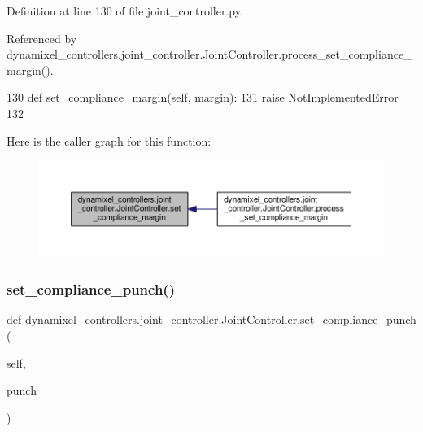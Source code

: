 Definition at line 130 of file joint\+\_\+controller.\+py.



Referenced by dynamixel\+\_\+controllers.\+joint\+\_\+controller.\+Joint\+Controller.\+process\+\_\+set\+\_\+compliance\+\_\+margin().


\begin{DoxyCode}
130     \textcolor{keyword}{def }set\_compliance\_margin(self, margin):
131         \textcolor{keywordflow}{raise} NotImplementedError
132 
\end{DoxyCode}
Here is the caller graph for this function\+:
\nopagebreak
\begin{figure}[H]
\begin{center}
\leavevmode
\includegraphics[width=350pt]{d3/dcd/classdynamixel__controllers_1_1joint__controller_1_1_joint_controller_ac05dc0cc7cfeade108bec65b5937c172_icgraph}
\end{center}
\end{figure}
\mbox{\label{classdynamixel__controllers_1_1joint__controller_1_1_joint_controller_a3d62f11f16ce860e39dfbfaa2b598a5b}} 
\subsubsection{\texorpdfstring{set\+\_\+compliance\+\_\+punch()}{set\_compliance\_punch()}}
{\footnotesize\ttfamily def dynamixel\+\_\+controllers.\+joint\+\_\+controller.\+Joint\+Controller.\+set\+\_\+compliance\+\_\+punch (\begin{DoxyParamCaption}\item[{}]{self,  }\item[{}]{punch }\end{DoxyParamCaption})}



